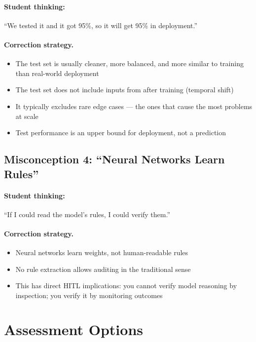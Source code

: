 \paragraph{Student thinking:} ``We tested it and it got 95\%, so it will get 95\% in deployment.''

\paragraph{Correction strategy.}
\begin{itemize}
    \item The test set is usually cleaner, more balanced, and more similar to training than real-world deployment
    \item The test set does not include inputs from after training (temporal shift)
    \item It typically excludes rare edge cases --- the ones that cause the most problems at scale
    \item Test performance is an upper bound for deployment, not a prediction
\end{itemize}

\subsection{Misconception 4: ``Neural Networks Learn Rules''}

\paragraph{Student thinking:} ``If I could read the model's rules, I could verify them.''

\paragraph{Correction strategy.}
\begin{itemize}
    \item Neural networks learn weights, not human-readable rules
    \item No rule extraction allows auditing in the traditional sense
    \item This has direct HITL implications: you cannot verify model reasoning by inspection; you verify it by monitoring outcomes
\end{itemize}

\section{Assessment Options}

